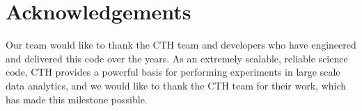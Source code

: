 \section*{Acknowledgements}

Our team would like to thank the CTH team and developers who have engineered
and delivered this code over the years.  As an extremely scalable, reliable
science code, CTH provides a powerful basis for performing experiments in large
scale data analytics, and we would like to thank the CTH team for their work,
which has made this milestone possible.
